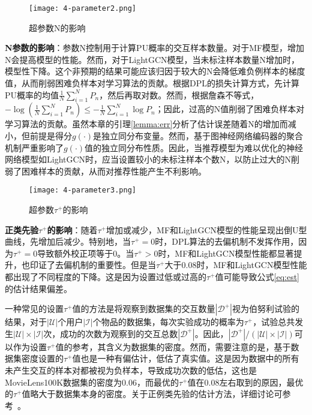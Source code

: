 \begin{figure*}[h!]
	\centering
	\texttt{[image: 4-parameter2.png]}
	\caption{超参数N的影响}
	\label{Fig:parameter2}
\end{figure*}
\textbf{N参数的影响}：参数N控制用于计算PU概率的交互样本数量。对于MF模型，增加N会提高模型的性能。然而，对于LightGCN模型，当未标注样本数量N增加时，模型性下降。这个非预期的结果可能应该归因于较大的N会降低难负例样本的梯度值，从而削弱困难负样本对学习算法的贡献。根据DPL的损失计算方式，先计算PU概率的均值$\frac{1}{N} \sum_{i=1}^N P_n$，然后再取对数。然而，根据詹森不等式，$-\log(\frac{1}{N} \sum_{i=1}^N P_n) \leq -\frac{1}{N} \sum_{i=1}^N \log P_n $；因此，过高的N值削弱了困难负样本对学习算法的贡献。虽然本章的引理\ref{lemma:err}分析了估计误差随着N的增加而减小，但前提是得分$g(\cdot)$是独立同分布变量。然而，基于图神经网络编码器的聚合机制严重影响了$g(\cdot)$值的独立同分布性质。因此，当推荐模型为难以优化的神经网络模型如LightGCN时，应当设置较小的未标注样本个数N，以防止过大的N削弱了困难样本的贡献，从而对推荐性能产生不利影响。

\begin{figure*}[h!]
	\centering
	\texttt{[image: 4-parameter3.png]}
	\caption{超参数$\tau^+$的影响}
	\label{Fig:parameter3}
\end{figure*}
\textbf{正类先验$\tau^+$的影响}：随着$\tau^+$增加或减少，MF和LightGCN模型的性能呈现出倒U型曲线，先增加后减少。特别地，当$\tau^+=0$时，DPL算法的去偏机制不发挥作用，因为$\tau^+=0$导致额外校正项等于0。当$\tau^+>0$时，MF和LightGCN模型性能都显著提升，也印证了去偏机制的重要性。但是当$\tau^+$大于0.08时，MF和LightGCN模型性能都出现了不同程度的下降。这是因为设置过低或过高的$\tau^+$值可能导致公式\eqref{eq:est}的估计结果偏差。

一种常见的设置$\tau^+$值的方法是将观察到数据集的交互数量$|\mathcal{D}^+|$视为伯努利试验的结果，对于$|\mathcal{U}|$个用户$|\mathcal{I}|$个物品的数据集，每次实验成功的概率为$\tau^+$，试验总共发生$|\mathcal{U}|\times |\mathcal{I}|$次，成功的次数为观察到的交互总数$|\mathcal{D}^+|$。因此，$|\mathcal{D}^+|/(|\mathcal{U}|\times |\mathcal{I}|)$可以作为设置$\tau^+$值的参考，其含义为数据集的密度。然而，需要注意的是，基于数据集密度设置的$\tau^+$值也是一种有偏估计，低估了真实值。这是因为数据中的所有未产生交互的样本对都被视为负样本，导致成功次数的低估，这也是MovieLens100K数据集的密度为0.06，而最优的$\tau^+$值在0.08左右取到的原因，最优的$\tau^+$值略大于数据集本身的密度。关于正例类先验的估计方法，详细讨论可参考~\cite{Jain:2016:NIPS,Christoffel:2016:ACML}。


